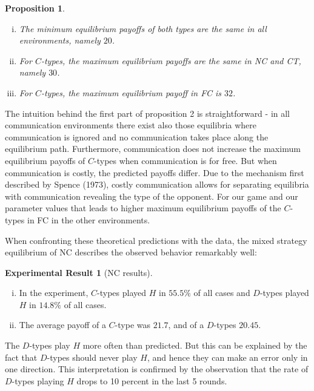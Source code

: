 \documentclass[12pt]{article}
\newtheorem{proposition}{Proposition} \theoremstyle{definition}
\theoremstyle{break}
\newtheorem{result}{Experimental Result}\theoremstyle{break}
\begin{document}
\begin{proposition}\label{prop:compare-payoffs}
	\begin{enumerate}[i)]\setlength\itemsep{0em}
		\item The minimum equilibrium payoffs of both types are the same in all environments, namely $20$. 
		\item For $C$-types, the maximum equilibrium payoffs are the same in NC and CT, namely $30$.
		\item For $C$-types, the maximum equilibrium payoff in FC is $32$.
	\end{enumerate}
\end{proposition}

The intuition behind the first part of proposition 2 is straightforward - in all communication environments there exist also those equilibria where communication is ignored and no communication takes place along the equilibrium path. Furthermore, communication does not increase the maximum equilibrium payoffs of $C$-types when communication is for free. But when communication is costly, the predicted payoffs differ. Due to the mechanism first described by Spence (1973), costly communication allows for separating equilibria with communication revealing the type of the opponent. For our game and our parameter values that leads to higher maximum equilibrium payoffs of the $C$-types in FC in the other environments.

When confronting these theoretical predictions with the data, the mixed strategy equilibrium of NC describes the observed behavior remarkably well:

\begin{result}[NC results]
	\begin{enumerate}[i)]\setlength\itemsep{0em}
		\item In the experiment, $C$-types played $H$ in $55.5\%$ of all cases and $D$-types played $H$ in $14.8\%$ of all cases.
		\item The average payoff of a $C$-type was $21.7$, and of a $D$-types $20.45$.
	\end{enumerate}
\end{result}


The $D$-types play $H$ more often than predicted. But this can be explained by the fact that $D$-types should never play $H$, and hence they can make an error only in one direction. This interpretation is confirmed by the observation that the rate of $D$-types playing $H$ drops to 10 percent in the last 5 rounds.
\end{document}
